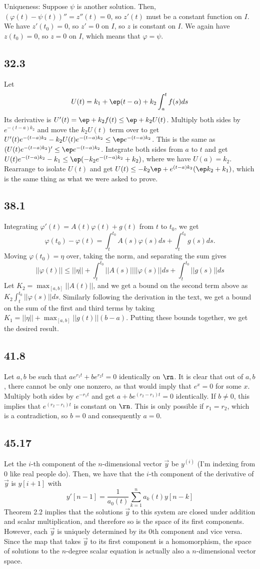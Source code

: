 \documentclass{article}
\begin{document}
Uniqueness: Suppose $\psi$ is another solution. Then, $(\varphi(t)-\psi(t))''=z''(t)=0$, so $z'(t)$ must be a constant function on $I$. We have $z'(t_0)=0$, so $z'=0$ on $I$, so $z$ is constant on $I$. We again have $z(t_0)=0$, so $z=0$ on $I$, which means that $\varphi=\psi$.
\subsection*{32.3}
Let $$U(t)=k_1+\ep(t-\alpha)+k_2\int_a^tf(s)ds$$ Its derivative is $U'(t)=\ep+k_2f(t)\leq\ep+k_2U(t)$. Multiply both sides by $e^{-(t-a)k_2}$ and move the $k_2U(t)$ term over to get $U'(t)e^{-(t-a)k_2}-k_2U(t)e^{-(t-a)k_2}\leq\ep e^{-(t-a)k_2}$. This is the same as $(U(t)e^{-(t-a)k_2})'\leq\ep e^{-(t-a)k_2}$. Integrate both sides from $a$ to $t$ and get $U(t)e^{-(t-a)k_2}-k_1\leq\ep(-k_2e^{-(t-a)k_2}+k_2)$, where we have $U(a)=k_2$. Rearrange to isolate $U(t)$ and get $U(t)\leq-k_2\ep+e^{(t-a)k_2}(\ep k_2+k_1)$, which is the same thing as what we were asked to prove.
\subsection*{38.1}
Integrating $\varphi'(t)=A(t)\varphi(t)+g(t)$ from $t$ to $t_0$, we get 
$$\varphi(t_0)-\varphi(t)=\int_t^{t_0}A(s)\varphi(s)ds+\int_t^{t_0}g(s)ds\text{.}$$
Moving $\varphi(t_0)=\eta$ over, taking the norm, and separating the sum gives 
$$||\varphi(t)||\leq||\eta||+\int_t^{t_0}||A(s)||||\varphi(s)||ds+\int_t^{t_0}||g(s)||ds$$
Let $K_2=\max_{[a,b]}||A(t)||$, and we get a bound on the second term above as $K_2\int_t^{t_0}||\varphi(s)||ds$. Similarly following the derivation in the text, we get a bound on the sum of the first and third terms by taking $K_1=||\eta||+\max_{[a,b]}||g(t)||(b-a)$. Putting these bounds together, we get the desired result.
\subsection*{41.8}
Let $a,b$ be such that $ae^{r_1t}+be^{r_2t}=0$ identically on $\rn$. It is clear that out of $a,b$, there cannot be only one nonzero, as that would imply that $e^x=0$ for some $x$. Multiply both sides by $e^{-r_1t}$ and get $a+be^{(r_2-r_1)t}=0$ identically. If $b\neq0$, this implies that $e^{(r_2-r_1)t}$ is constant on $\rn$. This is only possible if $r_1=r_2$, which is a contradiction, so $b=0$ and consequently $a=0$. 
\subsection*{45.17}
Let the $i$-th component of the $n$-dimensional vector $\vec{y}$ be $y^{(i)}$ (I'm indexing from 0 like real people do). Then, we have that the $i$-th component of the derivative of $\vec{y}$ is $y[i+1]$ with 
$$y'[n-1]=\frac{1}{a_0(t)}\sum_{k=1}^{n} a_k(t)y[n-k]$$
Theorem 2.2 implies that the solutions $\vec{y}$ to this system are closed under addition and scalar multiplication, and therefore so is the space of its first components. However, each $\vec{y}$ is uniquely determined by its $0$th component and vice versa. Since the map that takes $\vec{y}$ to its first component is a homomorphism, the space of solutions to the $n$-degree scalar equation is actually also a $n$-dimensional vector space.
\end{document}
